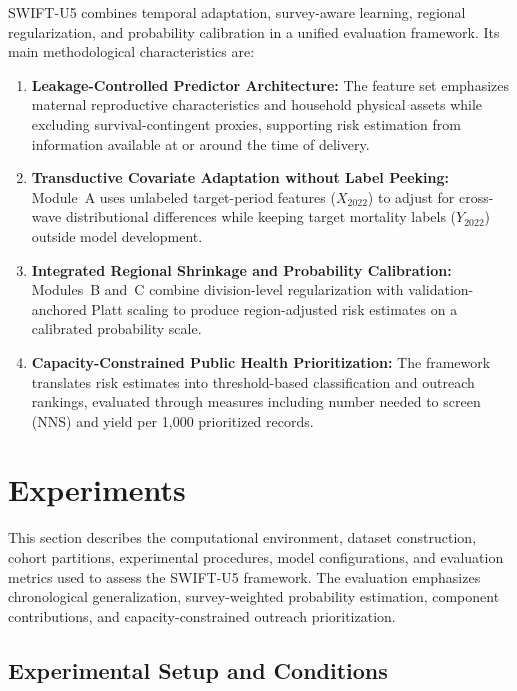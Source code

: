 \documentclass[a4paper,fleqn]{cas-sc}
\begin{document}
SWIFT-U5 combines temporal adaptation, survey-aware learning, regional regularization, and probability calibration in a unified evaluation framework. Its main methodological characteristics are:

\begin{enumerate}
    \item \textbf{Leakage-Controlled Predictor Architecture:} The feature set emphasizes maternal reproductive characteristics and household physical assets while excluding survival-contingent proxies, supporting risk estimation from information available at or around the time of delivery.

    \item \textbf{Transductive Covariate Adaptation without Label Peeking:} Module~A uses unlabeled target-period features ($X_{2022}$) to adjust for cross-wave distributional differences while keeping target mortality labels ($Y_{2022}$) outside model development.

    \item \textbf{Integrated Regional Shrinkage and Probability Calibration:} Modules~B and~C combine division-level regularization with validation-anchored Platt scaling to produce region-adjusted risk estimates on a calibrated probability scale.

    \item \textbf{Capacity-Constrained Public Health Prioritization:} The framework translates risk estimates into threshold-based classification and outreach rankings, evaluated through measures including number needed to screen (NNS) and yield per 1,000 prioritized records.
\end{enumerate}



\section{Experiments}
\label{sec:experiments}

This section describes the computational environment, dataset construction, cohort partitions, experimental procedures, model configurations, and evaluation metrics used to assess the SWIFT-U5 framework. The evaluation emphasizes chronological generalization, survey-weighted probability estimation, component contributions, and capacity-constrained outreach prioritization.

\subsection{Experimental Setup and Conditions}
\label{sec:exp_setup}
\end{document}
